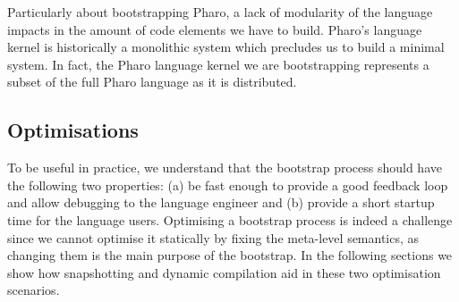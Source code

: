 Particularly about bootstrapping Pharo, a lack of modularity of the language impacts in the amount of code elements we have to build. Pharo's language kernel is historically a monolithic system which precludes us to build a minimal system. In fact, the Pharo language kernel we are bootstrapping represents a subset of the full Pharo language as it is distributed.

\subsection{Optimisations}\label{sec:optimisations}

To be useful in practice, we understand that the bootstrap process should have the following two properties: (a) be fast enough to provide a good feedback loop and allow debugging to the language engineer and (b) provide a short startup time for the language users. Optimising a bootstrap process is indeed a challenge since we cannot optimise it statically by fixing the meta-level semantics, as changing them is the main purpose of the bootstrap. In the following sections we show how snapshotting and dynamic compilation aid in these two optimisation scenarios. 

